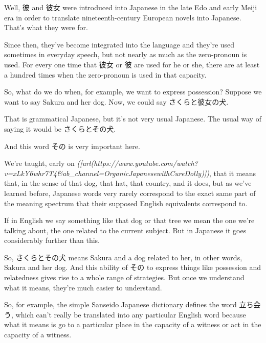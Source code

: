 {}

{}

Well, 彼 and 彼女 were introduced into Japanese in the late Edo and early Meiji era in order to translate nineteenth-century European novels into Japanese. That's what they were for.

Since then, they've become integrated into the language and they're used sometimes in everyday speech, but not nearly as much as the zero-pronoun is used. For every one time that 彼女 or 彼 are used for he or she, there are at least a hundred times when the zero-pronoun is used in that capacity.

So, what do we do when, for example, we want to express possession? Suppose we want to say Sakura and her dog. Now, we could say さくらと彼女の犬.

That is grammatical Japanese, but it's not very usual Japanese. The usual way of saying it would be さくらとその犬.

And this word その is very important here.

\stopsectionlevel

\startsectionlevel[title={その},reference={その}]

We're taught, early on {\em ([url(https://www.youtube.com/watch?v=xLkY6whr7T4&ab_channel=OrganicJapanesewithCureDolly)])}, that it means that, in the sense of that dog, that hat, that country, and it does, but as we've learned before, Japanese words very rarely correspond to the exact same part of the meaning spectrum that their supposed English equivalents correspond to.

If in English we say something like that dog or that tree we mean the one we're talking about, the one related to the current subject. But in Japanese it goes considerably further than this.

{}

{}

So, さくらとその犬 means Sakura and a dog related to her, in other words, Sakura and her dog. And this ability of その to express things like possession and relatedness gives rise to a whole range of strategies. But once we understand what it means, they're much easier to understand.

So, for example, the simple Sanseido Japanese dictionary defines the word 立ち会う, which can't really be translated into any particular English word because what it means is go to a particular place in the capacity of a witness or act in the capacity of a witness.

